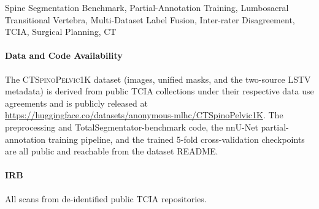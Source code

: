 \documentclass[pmlr]{jmlr}
\newcommand{\dataset}{\textsc{CTSpinoPelvic1K}}
\begin{document}
\begin{keywords}
Spine Segmentation Benchmark, Partial-Annotation Training,
Lumbosacral Transitional Vertebra, Multi-Dataset Label Fusion,
Inter-rater Disagreement, TCIA, Surgical Planning, CT
\end{keywords}

\paragraph*{Data and Code Availability}
The \dataset{} dataset (images, unified masks, and the two-source
LSTV metadata) is derived from public TCIA collections under their
respective data use agreements and is publicly released at
\url{https://huggingface.co/datasets/anonymous-mlhc/CTSpinoPelvic1K}.
The preprocessing and TotalSegmentator-benchmark code, the nnU-Net
partial-annotation training pipeline, and the trained 5-fold
cross-validation checkpoints are all public and reachable from the
dataset README.

\paragraph*{IRB} All scans from de-identified public TCIA
repositories.
\end{document}
